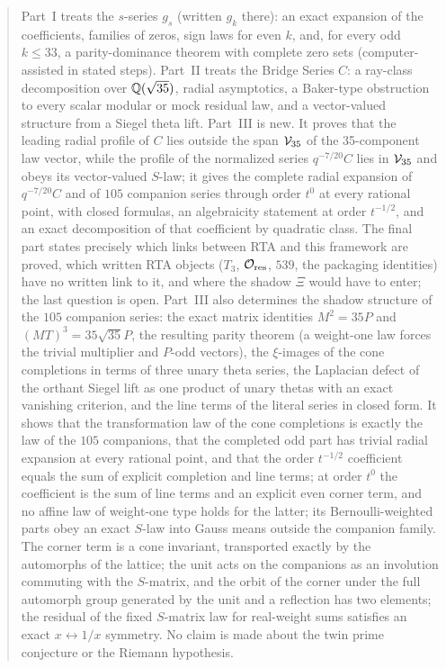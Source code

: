 \begin{abstract}
Part~I treats the $s$-series $g_s$ (written $g_k$ there): an exact expansion of the coefficients, families of zeros, sign laws for even $k$,
and, for every odd $k\le33$, a parity-dominance theorem with complete zero sets (computer-assisted in stated steps). Part~II treats the Bridge
Series $C$: a ray-class decomposition over $\Q(\sqrt{35})$, radial asymptotics, a Baker-type obstruction to every scalar modular or mock residual law,
and a vector-valued structure from a Siegel theta lift. Part~III is new. It proves that the leading radial profile of $C$ lies outside the span
$\VV$ of the 35-component law vector, while the profile of the normalized series $q^{-7/20}C$ lies in $\VV$ and obeys its vector-valued
$S$-law; it gives the complete radial expansion of $q^{-7/20}C$ and of $105$ companion series through order $t^0$ at every rational point,
with closed formulas, an algebraicity statement at order $t^{-1/2}$, and an exact decomposition of that coefficient by quadratic class.
The final part states precisely which links between RTA and this framework are proved, which written RTA objects ($T_3$, $\mathcal O_{\rm res}$,
$539$, the packaging identities) have no written link to it, and where the shadow $\Xi$ would have to enter; the last question is open.
Part~III also determines the shadow structure of the $105$ companion series: the exact matrix identities $M^2=35P$ and $(MT)^3=35\sqrt{35}P$, the resulting parity
theorem (a weight-one law forces the trivial multiplier and $P$-odd vectors), the $\xi$-images of the cone completions in terms of three unary theta series, the Laplacian
defect of the orthant Siegel lift as one product of unary thetas with an exact vanishing criterion, and the line terms of the literal series in closed form. It shows that the transformation law of the cone completions is exactly the law of the $105$ companions, that the completed odd part has trivial radial expansion at every rational point, and that the order $t^{-1/2}$ coefficient equals the sum of explicit completion and line terms; at order $t^0$ the coefficient is the sum of line terms and an explicit even corner term, and no affine law of weight-one type holds for the latter; its Bernoulli-weighted parts obey an exact $S$-law into Gauss means outside the companion family. The corner term is a cone invariant, transported exactly by the automorphs of the lattice; the unit acts on the companions as an involution commuting with the $S$-matrix, and the orbit of the corner under the full automorph group generated by the unit and a reflection has two elements; the residual of the fixed $S$-matrix law for real-weight sums satisfies an exact $x\leftrightarrow1/x$ symmetry.
No claim is made about the twin prime conjecture or the Riemann hypothesis.
\end{abstract}
\tableofcontents
\clearpage

